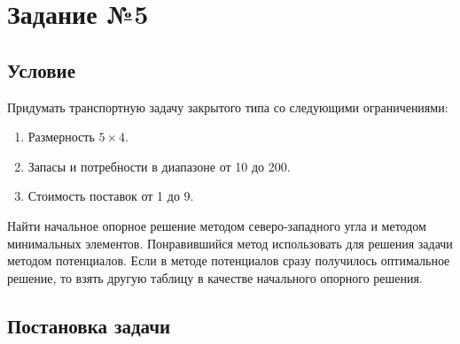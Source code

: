 \section{Задание №5}\label{05-lab}

\subsection{Условие}\label{05-lab-condition}

Придумать транспортную задачу закрытого типа со следующими ограничениями:
\begin{enumerate}
    \item Размерность $5 \times 4$.
    \item Запасы и потребности в диапазоне от 10 до 200.
    \item Стоимость поставок от 1 до 9.
\end{enumerate}

Найти начальное опорное решение методом северо-западного угла и методом минимальных элементов.
Понравившийся метод использовать для решения задачи методом потенциалов.
Если в методе потенциалов сразу получилось оптимальное решение, то взять другую таблицу в качестве начального опорного решения.

\subsection{Постановка задачи}\label{05-lab-statement}

